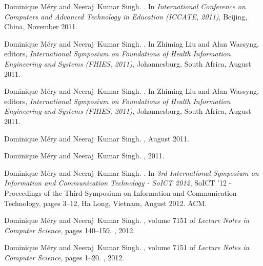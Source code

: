 \documentclass[ 12pt]{article}
\begin{document}
\begin{thebibliography}{100}
Dominique M{\'e}ry and Neeraj~Kumar Singh.
.
\newblock In {\em {International Conference on Computers and Advanced
  Technology in Education (ICCATE, 2011)}}, Beijing, China, November 2011.

Dominique M{\'e}ry and Neeraj~Kumar Singh.
.
\newblock In Zhiming Liu and Alan Wassyng, editors, {\em {International
  Symposium on Foundations of Health Information Engineering and Systems
  (FHIES, 2011)}}, Johannesburg, South Africa, August 2011.

Dominique M{\'e}ry and Neeraj~Kumar Singh.
.
\newblock In Zhiming Liu and Alan Wassyng, editors, {\em {International
  Symposium on Foundations of Health Information Engineering and Systems
  (FHIES, 2011)}}, Johannesburg, South Africa, August 2011.

Dominique M{\'e}ry and Neeraj~Kumar Singh.
, August 2011.

Dominique M{\'e}ry and Neeraj~Kumar Singh.
, 2011.

Dominique M{\'e}ry and Neeraj~Kumar Singh.
.
\newblock In {\em {3rd International Symposium on Information and Communication
  Technology - SoICT 2012}}, SoICT '12 - Proceedings of the Third Symposium on
  Information and Communication Technology, pages 3--12, Ha Long, Vietnam,
  August 2012. {ACM}.

Dominique M{\'e}ry and Neeraj~Kumar Singh.
, volume 7151 of {\em Lecture
  Notes in Computer Science}, pages 140--159.
, 2012.

Dominique M{\'e}ry and Neeraj~Kumar Singh.
, volume 7151
  of {\em Lecture Notes in Computer Science}, pages 1--20.
, 2012.


\end{thebibliography}
\end{document}
